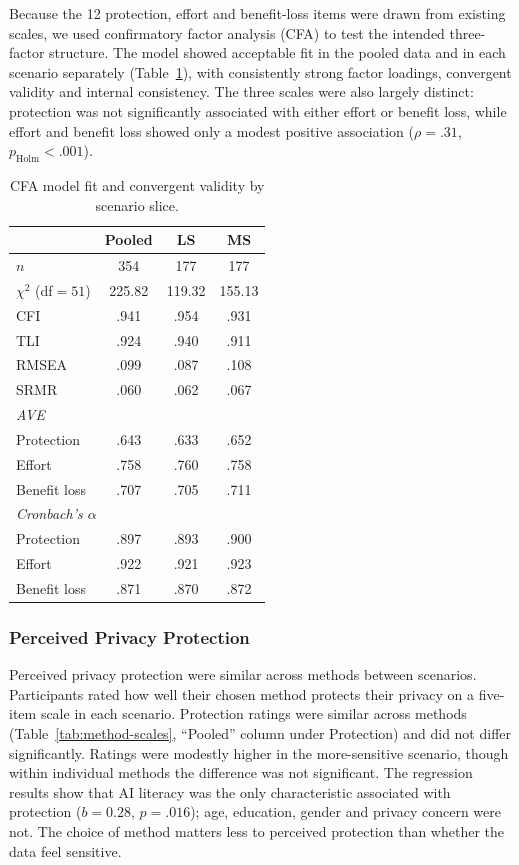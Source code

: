 \documentclass[conference,compsoc]{IEEEtran}
\begin{document}
Because the 12 protection, effort and benefit-loss items were drawn from existing scales, we used confirmatory factor analysis (CFA) to test the intended three-factor structure. The model showed acceptable fit in the pooled data and in each scenario separately (Table~\ref{tab:cfa-fit}), with consistently strong factor loadings, convergent validity and internal consistency. The three scales were also largely distinct: protection was not significantly associated with either effort or benefit loss, while effort and benefit loss showed only a modest positive association ($\rho=.31$, $p_{\mathrm{Holm}}<.001$).

\begin{table}[t]
\centering
\caption{CFA model fit and convergent validity by scenario slice.}
\label{tab:cfa-fit}
\small
\setlength{\tabcolsep}{4pt}
\begin{tabular}{lccc}
\toprule
 & Pooled & LS & MS \\
\midrule
$n$ & 354 & 177 & 177 \\
$\chi^2$ (df${}=51$) & 225.82 & 119.32 & 155.13 \\
CFI & .941 & .954 & .931 \\
TLI & .924 & .940 & .911 \\
RMSEA & .099 & .087 & .108 \\
SRMR & .060 & .062 & .067 \\
\midrule
\multicolumn{4}{l}{\textit{AVE}} \\
\quad Protection & .643 & .633 & .652 \\
\quad Effort & .758 & .760 & .758 \\
\quad Benefit loss & .707 & .705 & .711 \\
\midrule
\multicolumn{4}{l}{\textit{Cronbach's $\alpha$}} \\
\quad Protection & .897 & .893 & .900 \\
\quad Effort & .922 & .921 & .923 \\
\quad Benefit loss & .871 & .870 & .872 \\
\bottomrule
\end{tabular}
\end{table}

\subsubsection{Perceived Privacy Protection}

Perceived privacy protection were similar across methods between scenarios. Participants rated how well their chosen method protects their privacy on a five-item scale in each scenario. Protection ratings were similar across methods (Table~\ref{tab:method-scales}, “Pooled” column under Protection) and did not differ significantly. Ratings were modestly higher in the more-sensitive scenario, though within individual methods the difference was not significant. The regression results show that AI literacy was the only characteristic associated with protection ($b=0.28$, $p=.016$); age, education, gender and privacy concern were not. The choice of method matters less to perceived protection than whether the data feel sensitive.
\end{document}
